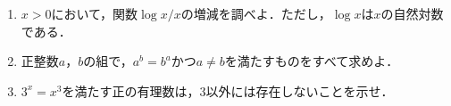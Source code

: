 \documentclass[../../main.tex]{subfiles}
\begin{document}
\begin{enumerate}
  \item $x>0$において，関数$\log x/x$の増減を調べよ．ただし，$\log x$は$x$の自然対数である．
  \item 正整数$a$，$b$の組で，$a^b=b^a$かつ$a\neq b$を満たすものをすべて求めよ．
  \item $3^x=x^3$を満たす正の有理数は，$3$以外には存在しないことを示せ．
\end{enumerate}
\end{document}
